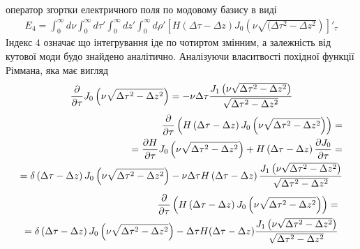 оператор згортки електричного поля по модовому базису в виді
%
\begin{equation*} \begin{aligned}
E_4 = \int_0^\infty d\nu \int_0^\infty d \tau' \int_0^\infty dz' 
\int_0^\infty d\rho' \left[ H(\Delta \tau - \Delta z) 
J_0 \left( \nu \sqrt{(\Delta \tau^2 - \Delta z^2} \right) \right]'_\tau
\end{aligned} \end{equation*}
%
Індекс $ 4 $ означає що інтегрування іде по чотиртом змінним, а залежність 
від кутової моди будо знайдено аналітично. Аналізуючи власитвості похідної 
функції Ріммана, яка має вигляд
%
\textcolor{lightgray} { \begin{equation*} \begin{aligned}
\frac{\partial }{\partial \tau} J_0 \left( \nu \sqrt{\Delta \tau^2 - \Delta z^2} \right) = 
- \nu \Delta \tau 
\frac{J_1 \left( \nu \sqrt{\Delta \tau^2 - \Delta z^2} \right)}
{\sqrt{\Delta \tau^2 - \Delta z^2}}
\end{aligned} \end{equation*} }
%
\textcolor{lightgray} { \begin{equation*} \begin{aligned}
\frac{\partial }{\partial \tau} \left( H \left( \Delta \tau - \Delta z \right)
J_0 \left( \nu \sqrt{ \Delta \tau^2 - \Delta z^2 } \right) \right) = \\
= \frac{\partial H}{\partial \tau} J_0 \left( \nu \sqrt{ \Delta \tau^2 - \Delta z^2 } \right) + 
H \left( \Delta \tau - \Delta z \right) \frac{\partial J_0}{\partial \tau} = \\
= \delta \left( \Delta \tau - \Delta z \right)
J_0 \left( \nu \sqrt{ \Delta \tau^2 - \Delta z^2 } \right) - 
\nu \Delta \tau H \left( \Delta \tau - \Delta z \right)
\frac{J_1 \left( \nu \sqrt{\Delta \tau^2 - \Delta z^2} \right)}
{\sqrt{\Delta \tau^2 - \Delta z^2}}
\end{aligned} \end{equation*} }
%
\begin{equation*} \begin{aligned}
\frac{\partial }{\partial \tau} \left( H \left( \Delta \tau - \Delta z \right)
J_0 \left( \nu \sqrt{ \Delta \tau^2 - \Delta z^2 } \right) \right) = \\
= \delta \left( \Delta \tau - \Delta z \right)
J_0 \left( \nu \sqrt{\Delta \tau^2 - \Delta z^2} \right) - 
\Delta \tau H(\Delta \tau - \Delta z) 
\frac{J_1 \left( \nu \sqrt{\Delta \tau^2 - \Delta z^2} \right)}
{\sqrt{\Delta \tau^2 - \Delta z^2}}
\end{aligned} \end{equation*}
